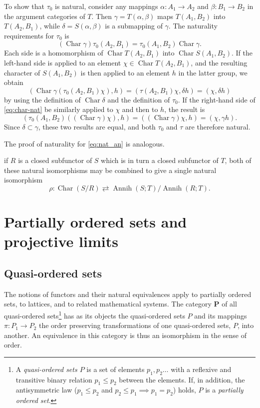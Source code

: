 \documentclass[11pt,a4paper]{report}
\DeclareMathOperator{\chr}{Char}
\DeclareMathOperator{\an}{Annih}
\begin{document}
To show that $\tau_0$ is natural, consider any mappings $\alpha:A_1\rightarrow A_2$ and $\beta:B_1\rightarrow B_2$ in
the argument categories of $T$. Then $\gamma=T(\alpha,\beta)$ maps $T(A_1,B_2)$ into $T(A_2,B_1)$, while $\delta = 
S(\alpha,\beta)$ is a submapping of $\gamma$. The naturality requirements for $\tau_0$ is
\begin{equation}\label{eq:char-nat}
	(\chr\gamma)\tau_0(A_2,B_1)=\tau_0 (A_1,B_2)\chr\gamma.
\end{equation}
Each side is a homomorphism of $\chr T(A_2,B_1)$ into  $\chr S(A_1,B_2)$. If the left\hyp{}hand side is applied to an
element $\chi\in\chr T(A_2,B_1)$, and the resulting character of $S(A_1,B_2)$ is then applied to an element $h$ in
the latter group, we obtain
\begin{equation*}
	(\chr\gamma(\tau_0(A_2,B_1)\chi),h) = (\tau(A_2,B_1)\chi,\delta h) = (\chi,\delta h)
\end{equation*}
by using the definition  of $\chr\delta$ and the definition  of $\tau_0$. If the 
right\hyp{}hand side of \cref{eq:char-nat} be similarly applied to $\chi$ and then to $h$, the result is
\begin{equation*}
	(\tau_0(A_1,B_2)((\chr\gamma)\chi),h)=((\chr\gamma)\chi,h)=(\chi,\gamma h).
\end{equation*}
Since $\delta\subset\gamma$, these two results are equal, and both $\tau_0$ and $\tau$ are therefore natural.

The proof of naturality for \cref{eq:nat_an} is analogous.

if $R$ is a closed subfunctor of $S$ which is in turn a closed subfunctor of $T$, both of these natural isomorphisms may be
combined to give a single natural isomorphism
\begin{equation}\label{eq:ann_comp}
	\rho:\chr(S/R)\rightleftarrows\an(S;T)/\an(R;T).
\end{equation}

\chapter{Partially ordered sets and projective limits}\label{ch:poset}
\section{Quasi-ordered sets}\label{sec:quasi-ord}
The notions of functors and their natural equivalences apply to partially ordered sets, to lattices, and to related
mathematical systems. The category $\mathbf{P}$ of all quasi\hyp{}ordered sets\footnote{A \emph{quasi\hyp{}ordered sets $P$}
is a set of elements $p_1,p_2\dotsc$ with a reflexive and transitive binary relation $p_1 \le  p_2$ between the elements. If,
in addition, the antisymmetric law ($p_1 \le  p_2$ and $p_2 \le  p_1 \implies p_1 = p_2$) holds, $P$ is a \emph{partially ordered set}.}
has as its objects the quasi\hyp{}ordered sets $P$ and its mappings $\pi:P_1\rightarrow P_2$ the order preserving transformations
of one quasi\hyp{}ordered sets, $P$, into another. An equivalence in this category is thus an isomorphism in the sense of order.
\end{document}
